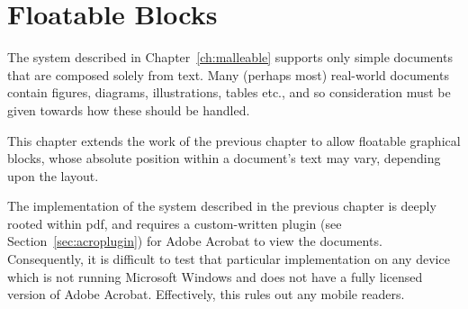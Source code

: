 \cleardoublepage
\chapter{Floatable Blocks}\label{ch:floats}


% 

The system described in Chapter~\ref{ch:malleable} supports only simple documents that are composed solely from text. Many (perhaps most) real-world documents contain figures, diagrams, illustrations, tables etc., and so consideration must be given towards how these should be handled.

This chapter extends the work of the previous chapter to allow floatable graphical blocks, whose absolute position within a document's text may vary, depending upon the layout.


The implementation of the system described in the previous chapter is deeply rooted within \gls{pdf}, and requires a custom-written plugin (see Section~\ref{sec:acroplugin}) for Adobe Acrobat to view the documents. Consequently, it is difficult to test that particular implementation on any device which is not running Microsoft Windows and does not have a fully licensed version of Adobe Acrobat. Effectively, this rules out any mobile \ebook{} readers.

